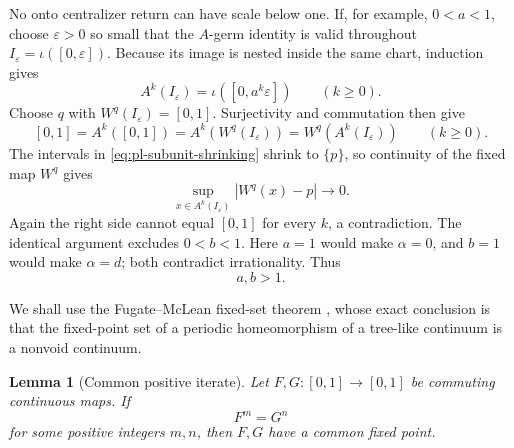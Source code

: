 \documentclass[11pt]{article}
\newtheorem{lemma}[theorem]{Lemma}
\theoremstyle{definition}
\theoremstyle{remark}
\newcommand{\I}{[0,1]}
\begin{document}
No onto centralizer return can have scale below one.  If, for example,
\(0<a<1\), choose \(\varepsilon>0\) so small that the \(A\)-germ identity is
valid throughout \(I_\varepsilon=\iota([0,\varepsilon])\).  Because its
image is nested inside the same chart, induction gives
\begin{equation}\label{eq:pl-subunit-shrinking}
 A^k(I_\varepsilon)=\iota([0,a^k\varepsilon])
 \qquad(k\geq0).
\end{equation}
Choose \(q\) with \(W^q(I_\varepsilon)=\I\).  Surjectivity and commutation
then give
\[
 \I=A^k(\I)=A^k(W^q(I_\varepsilon))
    =W^q(A^k(I_\varepsilon))
 \qquad(k\geq0).
\]
The intervals in \eqref{eq:pl-subunit-shrinking} shrink to \(\{p\}\), so
continuity of the fixed map \(W^q\) gives
\[
 \sup_{x\in A^k(I_\varepsilon)}|W^q(x)-p|\longrightarrow0.
\]
Again the right side cannot equal \(\I\) for every \(k\), a contradiction.
The identical argument excludes \(0<b<1\).
Here \(a=1\) would make \(\alpha=0\), and \(b=1\) would make \(\alpha=d\);
both contradict irrationality.  Thus
\begin{equation}\label{eq:pl-scales-positive}
 a,b>1.
\end{equation}

We shall use the Fugate--McLean fixed-set theorem
\cite[Corollary 1.5, p.~613]{FugateMcLean}, whose exact conclusion is that
the fixed-point set of a periodic homeomorphism of a tree-like continuum is
a nonvoid continuum.

\begin{lemma}[Common positive iterate]
\label{lem:pl-common-iterate}
Let \(F,G\colon\I\to\I\) be commuting continuous maps.  If
\[
 F^m=G^n
\]
for some positive integers \(m,n\), then \(F,G\) have a common fixed point.
\end{lemma}
\end{document}
